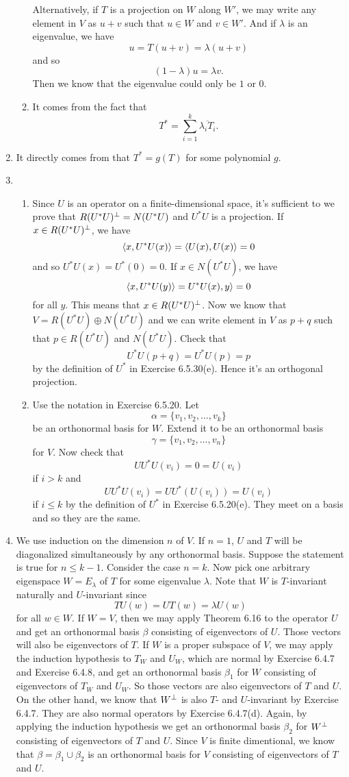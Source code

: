 \begin{enumerate}
\begin{enumerate}
Alternatively, if $T$ is a projection on $W$ along $W'$, we may write any element in $V$ as $u+v$ such that $u\in W$ and $v\in W'$. And if $\lambda $ is an eigenvalue, we have 
\[u=T(u+v)=\lambda(u+v)\]
and so 
\[(1-\lambda)u=\lambda v.\]
Then we know that the eigenvalue could only be $1$ or $0$.
\item It comes from the fact that 
\[T^*=\sum_{i=1}^k{\overline{\lambda_iT_i}}.\]
\end{enumerate}
\item It directly comes from that $T^*=g(T)$ for some polynomial $g$.
\item \begin{enumerate}
\item Since $U$ is an operator on a finite-dimensional space, it's sufficient to we prove that $R(U^*U)^{\perp} =N(U^*U)$ and $U^*U$ is a projection. If $x\in R(U^*U)^{\perp}$, we have 
\[\langle x,U^*U(x)\rangle =\langle U(x),U(x)\rangle =0\]
and so $U^*U(x)=U^*(0)=0$. If $x\in N(U^*U)$, we have 
\[\langle x,U^*U(y)\rangle =U^*U(x),y\rangle =0\]
for all $y$. This means that $x\in R(U^*U)^{\perp}$. Now we know that $V=R(U^*U)\oplus N(U^*U)$ and we can write element in $V$ as $p+q$ such that $p\in R(U^*U)$ and $N(U^*U)$. Check that 
\[U^*U(p+q)=U^*U(p)=p\]
by the definition of $U^*$ in Exercise 6.5.30(e). Hence it's an orthogonal projection.
\item Use the notation in Exercise 6.5.20. Let 
\[\alpha=\{v_1,v_2,\ldots ,v_k\}\]
be an orthonormal basis for $W$. Extend it to be an orthonormal basis 
\[\gamma=\{v_1,v_2,\ldots ,v_n\}\]
for $V$. Now check that 
\[UU^*U(v_i)=0=U(v_i)\]
if $i>k$ and 
\[UU^*U(v_i)=UU^*(U(v_i))=U(v_i)\]
if $i\leq k$ by the definition of $U^*$ in Exercise 6.5.20(e). They meet on a basis and so they are the same.
\end{enumerate}
\item We use induction on the dimension $n$ of $V$. If $n=1$, $U$ and $T$ will be diagonalized simultaneously by any orthonormal basis. Suppose the statement is true for $n\leq k-1$. Consider the case $n=k$. Now pick one arbitrary eigenspace $W=E_{\lambda}$ of $T$ for some eigenvalue $\lambda$. Note that $W$ is $T$-invariant naturally and $U$-invariant since 
\[TU(w)=UT(w)=\lambda U(w)\]
for all $w\in W$. If $W=V$, then we may apply Theorem 6.16 to the operator $U$ and get an orthonormal basis $\beta $ consisting of eigenvectors of $U$. Those vectors will also be eigenvectors of $T$. If $W$ is a proper subspace of $V$, we may apply the induction hypothesis to $T_W$ and $U_W$, which are normal by Exercise 6.4.7 and Exercise 6.4.8, and get an orthonormal basis $\beta_1$ for $W$ consisting of eigenvectors of $T_W$ and $U_W$. So those vectors are also eigenvectors of $T$ and $U$. On the other hand, we know that $W^{\perp}$ is also $T$- and $U$-invariant by Exercise 6.4.7. They are also normal operators by Exercise 6.4.7(d). Again, by applying the induction hypothesis we get an orthonormal basis $\beta_2$ for $W^{\perp}$ consisting of eigenvectors of $T$ and $U$. Since $V$ is finite dimentional, we know that $\beta =\beta_1\cup \beta_2$ is an orthonormal basis for $V$ consisting of eigenvectors of $T$ and $U$.

\end{enumerate}
